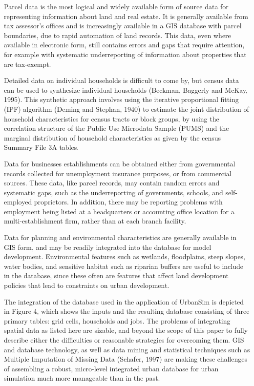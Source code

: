 Parcel data is the most logical and widely available form of source data for representing information about land and real estate.  It is generally available from tax assessor's offices and is increasingly available in a GIS database with parcel boundaries, due to rapid automation of land records.  This data, even where available in electronic form, still contains errors and gaps that require attention, for example with systematic underreporting of information about properties that are tax-exempt.

Detailed data on individual households is difficult to come by, but census data can be used to synthesize individual households (Beckman, Baggerly and McKay, 1995). This synthetic approach involves using the iterative proportional fitting (IPF) algorithm (Deming and Stephan, 1940) to estimate the joint distribution of household characteristics for census tracts or block groups, by using the correlation structure of the Public Use Microdata Sample (PUMS) and the marginal distribution of household characteristics as given by the census Summary File 3A tables.

Data for businesses establishments can be obtained either from governmental records collected for unemployment insurance purposes, or from commercial sources.  These data, like parcel records, may contain random errors and systematic gaps, such as the underreporting of governments, schools, and self-employed proprietors.  In addition, there may be reporting problems with employment being listed at a headquarters or accounting office location for a multi-establishment firm, rather than at each branch facility.

Data for planning and environmental characteristics are generally available in GIS form, and may be readily integrated into the database for model development.  Environmental features such as wetlands, floodplains, steep slopes, water bodies, and sensitive habitat such as riparian buffers are useful to include in the database, since these often are features that affect land development policies that lead to constraints on urban development.

The integration of the database used in the application of UrbanSim is depicted in Figure 4, which shows the inputs and the resulting database consisting of three primary tables: grid cells, households and jobs.  The problems of integrating spatial
data as listed here are sizable, and beyond the scope of this paper to fully describe either the difficulties or reasonable strategies for overcoming them.  GIS and database technology, as well as data mining and statistical techniques such as Multiple Imputation of Missing Data (Schafer, 1997) are making these challenges of assembling a robust, micro-level integrated urban database for urban simulation much more manageable than in the past.

